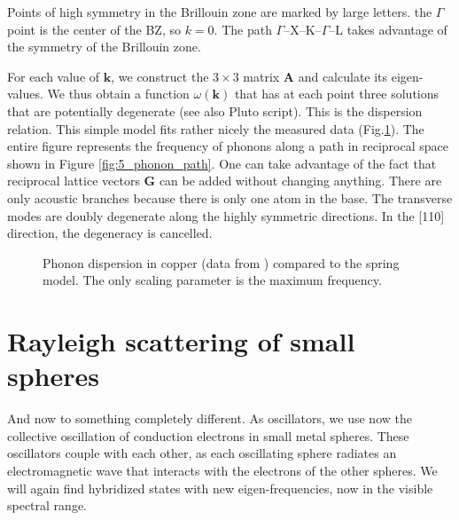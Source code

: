 \begin{marginfigure}
\caption{Points of high symmetry in the Brillouin zone are marked by large letters. the $\Gamma$ point is the center of the BZ, so $k=0$. The path $\Gamma$--X--K--$\Gamma$--L takes advantage of the symmetry of the Brillouin zone. \label{fig:5_phonon_path} }
\end{marginfigure}

For each value of $\mathbf{k}$, we construct the $3 \times 3$ matrix $\mathbf{A}$ and calculate its eigen-values. We thus obtain a function $\omega(\mathbf{k})$ that has at each point three solutions that are  potentially degenerate (see also Pluto script). This is the dispersion relation. This simple model fits rather nicely the measured data (Fig.\ref{fig:5_phonon_copper}). The entire figure represents the frequency of phonons along a path in reciprocal space shown in Figure \ref{fig:5_phonon_path}. One can take advantage of the fact that reciprocal lattice vectors $\mathbf{G}$ can be added without changing anything. There are only acoustic branches because there is only one atom in the base. The transverse modes are doubly degenerate along the highly symmetric directions. In the [110] direction, the degeneracy is cancelled.
 

\begin{figure}
\caption{Phonon dispersion in copper (data from \cite{Svensson_cu}) compared to the spring model. The only scaling parameter is the maximum frequency. \label{fig:5_phonon_copper}}
\end{figure}



\section{Rayleigh scattering of small spheres}


And now to something completely different. As oscillators, we use now the collective oscillation of conduction electrons in small metal spheres. These oscillators couple with each other, as each oscillating sphere radiates an electromagnetic wave that interacts with the electrons of the other spheres. We will again find hybridized states with new eigen-frequencies, now in the visible spectral range.

